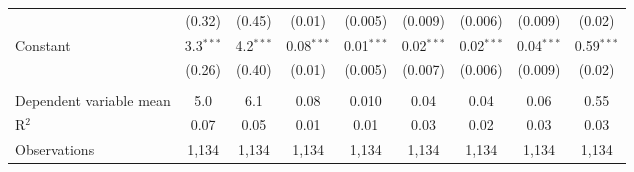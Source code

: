 \begin{adjustbox}{width = \textwidth, center}
\begin{tabular}{lcccccccc}
                              & (0.32)       & (0.45)       & (0.01)       & (0.005)       & (0.009)               & (0.006)               & (0.009)      & (0.02)\\   
      Constant                & 3.3$^{***}$  & 4.2$^{***}$  & 0.08$^{***}$ & 0.01$^{***}$  & 0.02$^{***}$          & 0.02$^{***}$          & 0.04$^{***}$ & 0.59$^{***}$\\   
                              & (0.26)       & (0.40)       & (0.01)       & (0.005)       & (0.007)               & (0.006)               & (0.009)      & (0.02)\\   
       \\
      Dependent variable mean & 5.0          & 6.1          & 0.08         & 0.010         & 0.04                  & 0.04                  & 0.06         & 0.55\\  
      R$^2$                   & 0.07         & 0.05         & 0.01         & 0.01          & 0.03                  & 0.02                  & 0.03         & 0.03\\  
      Observations            & 1,134        & 1,134        & 1,134        & 1,134         & 1,134                 & 1,134                 & 1,134        & 1,134\\  
      \bottomrule
   \end{tabular}
\end{adjustbox}
\par\endgroup


